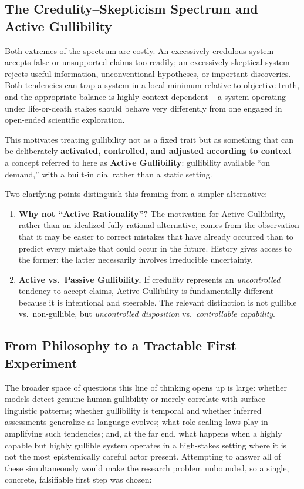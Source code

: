 \documentclass[11pt]{article}
\begin{document}
\subsection{The Credulity--Skepticism Spectrum and Active Gullibility}

Both extremes of the spectrum are costly. An excessively credulous system accepts false or unsupported claims too readily; an excessively skeptical system rejects useful information, unconventional hypotheses, or important discoveries. Both tendencies can trap a system in a local minimum relative to objective truth, and the appropriate balance is highly context-dependent -- a system operating under life-or-death stakes should behave very differently from one engaged in open-ended scientific exploration.

This motivates treating gullibility not as a fixed trait but as something that can be deliberately \textbf{activated, controlled, and adjusted according to context} -- a concept referred to here as \textbf{Active Gullibility}: gullibility available ``on demand,'' with a built-in dial rather than a static setting.

Two clarifying points distinguish this framing from a simpler alternative:

\begin{enumerate}
    \item \textbf{Why not ``Active Rationality''?} The motivation for Active Gullibility, rather than an idealized fully-rational alternative, comes from the observation that it may be easier to correct mistakes that have already occurred than to predict every mistake that could occur in the future. History gives access to the former; the latter necessarily involves irreducible uncertainty.
    \item \textbf{Active vs.\ Passive Gullibility.} If credulity represents an \emph{uncontrolled} tendency to accept claims, Active Gullibility is fundamentally different because it is intentional and steerable. The relevant distinction is not gullible vs.\ non-gullible, but \emph{uncontrolled disposition} vs.\ \emph{controllable capability}.
\end{enumerate}

\subsection{From Philosophy to a Tractable First Experiment}

The broader space of questions this line of thinking opens up is large: whether models detect genuine human gullibility or merely correlate with surface linguistic patterns; whether gullibility is temporal and whether inferred assessments generalize as language evolves; what role scaling laws play in amplifying such tendencies; and, at the far end, what happens when a highly capable but highly gullible system operates in a high-stakes setting where it is not the most epistemically careful actor present. Attempting to answer all of these simultaneously would make the research problem unbounded, so a single, concrete, falsifiable first step was chosen:
\end{document}

